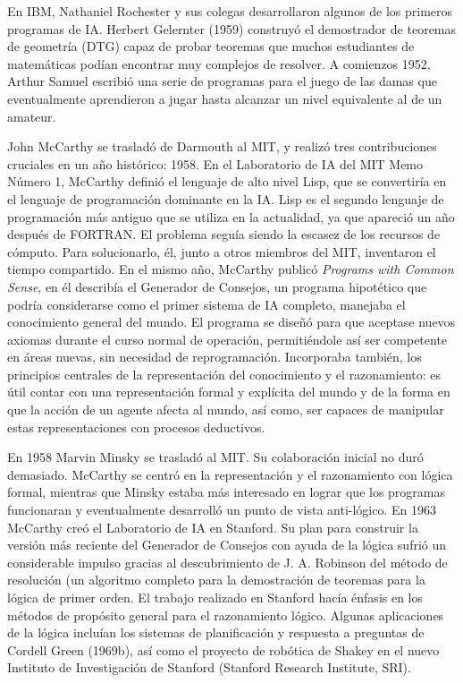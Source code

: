 \documentclass{article}
\begin{document}
En IBM, Nathaniel Rochester y sus colegas desarrollaron algunos de los primeros programas de IA. Herbert Gelernter (1959) construyó el demostrador de teoremas de geometría (DTG) capaz de probar teoremas que muchos estudiantes de matemáticas podían encontrar muy complejos de resolver. A comienzos 1952, Arthur Samuel escribió una serie de programas para el juego de las damas que eventualmente aprendieron a jugar hasta alcanzar un nivel equivalente al de un amateur.

John McCarthy se trasladó de Darmouth al MIT, y realizó tres contribuciones cruciales en un año histórico: 1958. En el Laboratorio de IA del MIT Memo Número 1, McCarthy definió el lenguaje de alto nivel Lisp, que se convertiría en el lenguaje de programación dominante en la IA. Lisp es el segundo lenguaje de programación más antiguo que se utiliza en la actualidad, ya que apareció un año después de FORTRAN. El problema seguía siendo la escasez de los recursos de cómputo. Para solucionarlo, él, junto a otros miembros del MIT, inventaron el tiempo compartido. En el mismo año, McCarthy publicó \textit{Programs with Common Sense}, en él describía el Generador de Consejos,  un programa hipotético que podría considerarse como el primer sistema de IA completo, manejaba el conocimiento general del mundo.  El programa se diseñó para que aceptase nuevos axiomas durante el curso normal de operación, permitiéndole así ser competente en áreas nuevas, sin necesidad de reprogramación. Incorporaba también, los principios centrales de la representación del conocimiento y el razonamiento: es útil contar con una representación formal y explícita del mundo y de la forma en que la acción de un agente afecta al mundo, así como, ser capaces de manipular estas representaciones con procesos deductivos.

En 1958 Marvin Minsky se trasladó al MIT. Su colaboración inicial no duró demasiado. McCarthy se centró en la representación y el razonamiento con lógica formal, mientras que Minsky estaba más interesado en lograr que los programas funcionaran y eventualmente desarrolló un punto de vista anti-lógico. En 1963 McCarthy creó el Laboratorio de IA en Stanford. Su plan para construir la versión más reciente del Generador de Consejos con ayuda de la lógica sufrió un considerable impulso gracias al descubrimiento de J. A. Robinson del método de resolución (un algoritmo completo para la demostración de teoremas para la lógica de primer orden. El trabajo realizado en Stanford hacía énfasis en los métodos de propósito general para el razonamiento lógico. Algunas aplicaciones de la lógica incluían los sistemas de planificación y respuesta a preguntas de Cordell Green (1969b), así como el proyecto de robótica de Shakey en el nuevo Instituto de Investigación de Stanford (Stanford Research Institute, SRI). 
\end{document}

